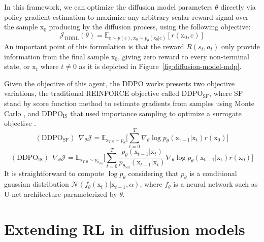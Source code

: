 In this framework, we can optimize the diffusion model parameters 
$\theta$ directly via policy gradient estimation to maximize any arbitrary
scalar-reward signal over the sample $\mathrm{x}_{0}$ producing by the diffusion
process, using the following objective:
\begin{equation}\label{difusion-rl-objective-1}
  \mathcal{J}_{\text{DDRL}}(\theta)
  = \mathbb{E}_{\mathrm{c}\sim p(\mathrm{c}),  \mathrm{x}_{0}\sim p_{\theta}(\mathrm{x}_{0}|\mathrm{c})}[ r(\mathrm{x}_{0}, \mathrm{c})]
\end{equation}
An important point of this formulation is that the reward $R(s_{t}, a_{t})$
only provide information from the final sample $\mathrm{x}_{0}$, giving zero
reward to every non-terminal state, or $\mathrm{x}_{t}$ where $t\neq0$ as it is
depicted in Figure~\ref{fig:diffusion-model-mdp}.

Given the objective of this agent, the DDPO works presents two objective 
variations, the traditional REINFORCE objective \cite{williams1992simple} called $\text{DDPO}_{\text{SF}}$, where SF stand by score function method to estimate gradients from samples using Monte Carlo \cite{mohamed2020monte}, and $\text{DDPO}_{\text{IS}}$ that used importance sampling to optimize a surrogate objective \cite{schulman2015trust} \cite{schulman2017proximal}.
\begin{equation}\label{eqn:ddpo-sf-objective}
  (\text{DDPO}_{\text{SF}})~~ \nabla_{\theta}\mathcal{J} = \mathbb{E}_{\mathrm{x}_{T:0}\sim p_{\theta}} \bigg[\sum_{t=0}^{T}\nabla_{\theta}\log p_{\theta}(\mathrm{x_{t-1}|\mathrm{x}_t}) r(\mathrm{x}_{0})\bigg]
\end{equation}
\begin{equation}\label{eqn:ddpo-is-objective}
  (\text{DDPO}_{\text{IS}})~~ \nabla_{\theta}\mathcal{J} = \mathbb{E}_{\mathrm{x}_{T:0}\sim p_{\theta_{\text{old}}}} \bigg[\sum_{t=0}^{T}\frac{p_{\theta}(\mathrm{x}_{t-1}|\mathrm{x}_{t})}{p_{\theta_{\text{old}}}(\mathrm{x}_{t-1}|\mathrm{x}_{t})}\nabla_{\theta}\log p_{\theta}(\mathrm{x_{t-1}|\mathrm{x}_t}) r(\mathrm{x}_{0})\bigg]
\end{equation}
It is straightforward to compute $\log p_{\theta}$ considering that
$p_{\theta}$ is a conditional gaussian distribution 
$\mathcal{N}(f_{\theta}(\mathrm{x}_{t}) | \mathrm{x}_{t-1}, \alpha)$, where
$f_{\theta}$ is a neural network such as U-net architecture parameterized by $\theta$.

\section{Extending RL in diffusion models}

